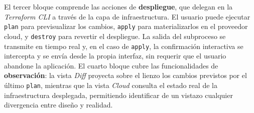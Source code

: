 \documentclass{article}
\begin{document}
{        \justify
        El tercer bloque comprende las acciones de \textbf{despliegue}, que
        delegan en la \textit{Terraform CLI} a través de la capa de
        infraestructura. El usuario puede ejecutar \texttt{plan} para previsualizar
        los cambios, \texttt{apply} para materializarlos en el proveedor cloud, y
        \texttt{destroy} para revertir el despliegue. La salida del subproceso se
        transmite en tiempo real y, en el caso de
        \texttt{apply}, la confirmación interactiva se intercepta y se envía desde
        la propia interfaz, sin requerir que el usuario abandone la aplicación.
        El cuarto bloque cubre las funcionalidades de \textbf{observación}:
        la vista \textit{Diff} proyecta sobre el lienzo los cambios previstos por
        el último \texttt{plan}, mientras que la vista \textit{Cloud} consulta el
        estado real de la
        infraestructura desplegada, permitiendo identificar de un vistazo
        cualquier divergencia entre diseño y realidad.
    }

    \newpage
\end{document}
